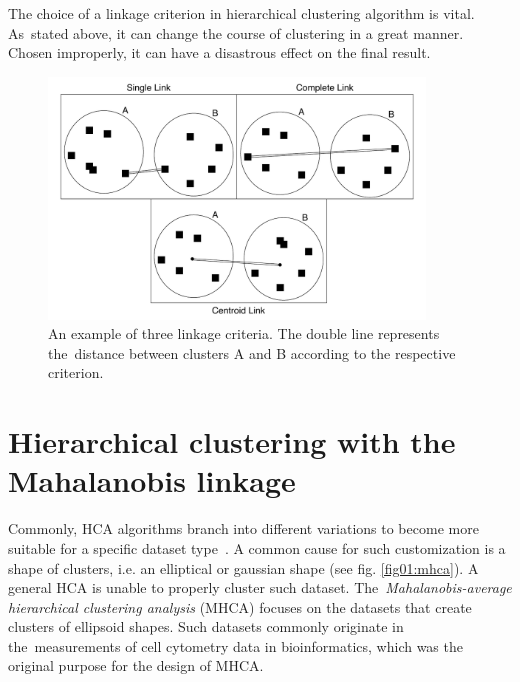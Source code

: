 The choice of a linkage criterion in hierarchical clustering algorithm is vital. As~stated above, it can change the course of clustering in a great manner. Chosen improperly, it can have a disastrous effect on the final result.

\begin{figure}\centering
	\includegraphics[width=10cm]{img/linkage_criteria}
	\caption{An example of three linkage criteria. The double line represents the~distance between clusters A and B according to the respective criterion.}
	\label{fig01:link}
\end{figure}

\section{Hierarchical clustering with the Ma\-ha\-la\-no\-bis linkage}

Commonly, HCA algorithms branch into different variations to become more suitable for a specific dataset type~\cite{murtagh2008hierarchical,oh2004hierarchical,zhao2005hierarchical}. A common cause for such customization is a shape of clusters, i.e. an elliptical or gaussian shape (see fig. \ref{fig01:mhca}). A general HCA is unable to properly cluster such dataset. The~\emph{Ma\-ha\-la\-no\-bis-average hierarchical clustering analysis} (MHCA) focuses on the datasets that create clusters of ellipsoid shapes. Such datasets commonly originate in the~measurements of cell cytometry data in bioinformatics, which was the original purpose for the design of MHCA.

